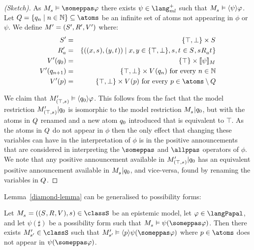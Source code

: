 \begin{proof}[(Sketch)]
    As $\kPModel{\kStateS} \entails \someppas \phi$ there exists $\psi \in \langMlPlus$ such that $\kPModel{\kStateS} \entails \announceE{\psi} \phi$.
    Let $\atomsQ = \{\atomQ_n \mid n \in \naturals\} \subseteq \atoms$ be an infinite set of atoms not appearing in $\phi$ or $\psi$.
    We define $\kModelAndTuple[\prime]$ where:
    \begin{eqnarray*}
        \kStates[\prime] &=& \{\top, \bot\} \times \kStates\\
        \kAccessibility[\prime]{\agentA} &=& \{((x, \kStateS), (y, \kStateT)) \mid x, y \in \{\top, \bot\}, \kStateS, \kStateT \in \kStates, \kStateS \kAccessibility{\agentA} \kStateT \}\\
        \kValuation[\prime](\atomQ_0) &=& \{\top\} \times \interpretation[\kModel]{\psi}\\
        \kValuation[\prime](\atomQ_{n + 1}) &=&  \{\top, \bot\} \times \kValuation(\atomQ_n) \text{ for every } n \in \naturals\\
        \kValuation[\prime](\atomP) &=& \{\top, \bot\} \times \kValuation(\atomP) \text{ for every } \atomP \in \atoms \setminus \atomsQ
    \end{eqnarray*}

    We claim that $\kPModel[\prime]{(\top, \kStateS)} \entails \announceE{\atomQ_0} \phi$.
    This follows from the fact that the model restriction $\restrict{\kPModel[\prime]{(\top, \kStateS)}}{\atomQ_0}$ is isomorphic to the model restriction $\restrict{\kPModel{\kStateS}}{\atomQ_0}$, but with the atoms in $Q$ renamed and a new atom $q_0$ introduced that is equivalent to $\top$.
    As the atoms in $Q$ do not appear in $\phi$ then the only effect that changing these variables can have in the interpretation of $\phi$ is in the positive announcements that are considered in interpreting the $\someppas$ and $\allppas$ operators of $\phi$.
    We note that any positive announcement available in $\restrict{\kPModel[\prime]{(\top, \kStateS)}}{\atomQ_0}$ has an equivalent positive announcement available in $\restrict{\kPModel{\kStateS}}{\atomQ_0}$, and vice-versa, found by renaming the variables in $Q$.
\end{proof}

Lemma~\ref{diamond-lemma} can be generalised to possibility forms:

\begin{lemma}\label{possibility-lemma}
    Let $\kPModelAndTuple{\kStateS} \in \classS$ be an epistemic model,
    let $\phi \in \langPapal$, and
    let $\psi(\sharp)$ be a possibility form such that $\kPModel{\kStateS} \entails \psi(\someppas \phi)$.
    Then there exists $\kPModel[\prime]{\kStateS[\prime]} \in \classS$ such that $\kPModel[\prime]{\kStateS[\prime]} \entails \announceE{\atomP} \psi(\someppas \phi)$ where $\atomP \in \atoms$ does not appear in $\psi(\someppas \phi)$.
\end{lemma}


